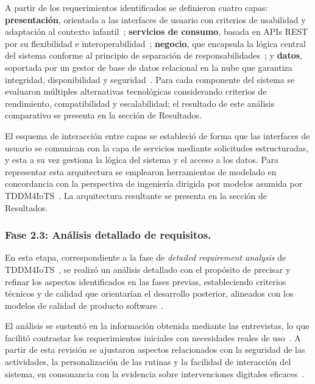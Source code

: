 					A partir de los requerimientos identificados se definieron cuatro capas: \textbf{presentación}, orientada a las interfaces de usuario con criterios de usabilidad y adaptación al contexto infantil~\cite{Hourcade2015,Nielsen1994}; \textbf{servicios de consumo}, basada en APIs REST por su flexibilidad e interoperabilidad~\cite{Kleppmann2017}; \textbf{negocio}, que encapsula la lógica central del sistema conforme al principio de separación de responsabilidades~\cite{Fowler2002}; y \textbf{datos}, soportada por un gestor de base de datos relacional en la nube que garantiza integridad, disponibilidad y seguridad~\cite{GuerreroUlloa2024}. Para cada componente del sistema se evaluaron múltiples alternativas tecnológicas considerando criterios de rendimiento, compatibilidad y escalabilidad; el resultado de este análisis comparativo se presenta en la sección de Resultados.
					
					El esquema de interacción entre capas se estableció de forma que las interfaces de usuario se comunican con la capa de servicios mediante solicitudes estructuradas, y esta a su vez gestiona la lógica del sistema y el acceso a los datos. Para representar esta arquitectura se emplearon herramientas de modelado en concordancia con la perspectiva de ingeniería dirigida por modelos asumida por TDDM4IoTS~\cite{GuerreroUlloa2024,Kleppmann2017}. La arquitectura resultante se presenta en la sección de Resultados.
					
				\subsubsection{Fase 2.3: Análisis detallado de requisitos.}
					En esta etapa, correspondiente a la fase de \textit{detailed requirement analysis} de TDDM4IoTS~\cite{GuerreroUlloa2024}, se realizó un análisis detallado con el propósito de precisar y refinar los aspectos identificados en las fases previas, estableciendo criterios técnicos y de calidad que orientarían el desarrollo posterior, alineados con los modelos de calidad de producto software~\cite{Fowler2002}.
					
					El análisis se sustentó en la información obtenida mediante las entrevistas, lo que facilitó contrastar los requerimientos iniciales con necesidades reales de uso~\cite{HernandezSampieri2014}. A partir de esta revisión se ajustaron aspectos relacionados con la seguridad de las actividades, la personalización de las rutinas y la facilidad de interacción del sistema, en consonancia con la evidencia sobre intervenciones digitales eficaces~\cite{Baumann2022,WangJun2024}.
					
